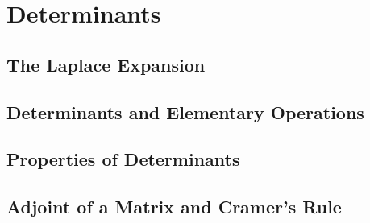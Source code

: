 \chapter{Determinants}
\section{The Laplace Expansion}

\newpage
\section{Determinants and Elementary Operations}

\newpage
\section{Properties of Determinants}

\newpage
\section{Adjoint of a Matrix and Cramer's Rule}

